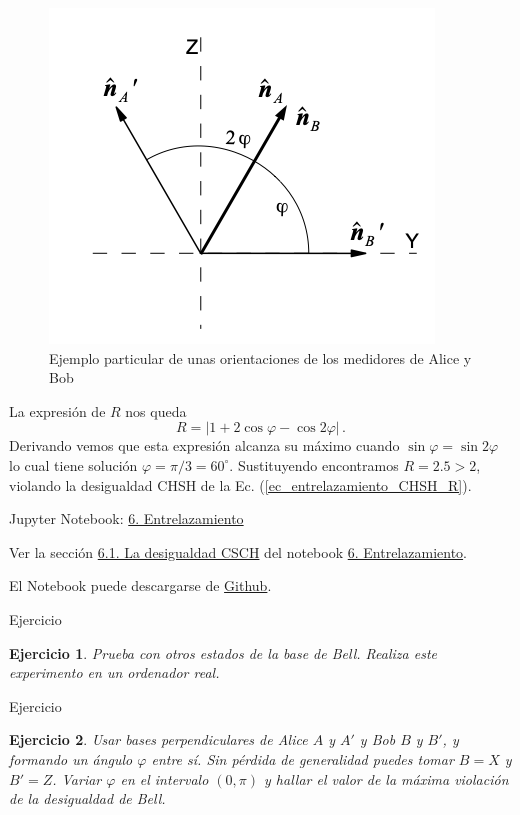 \documentclass[a4paper,11pt]{book} %
\newtheorem{ejercicio_contador}{Ejercicio}
\newcommand{\Ejercicio}[1]{
		\begin{mybox_gray}{Ejercicio} 
			\begin{ejercicio_contador}
				 #1 
			\end{ejercicio_contador} 
		\end{mybox_gray}
	}
\numberwithin{equation}{chapter}
\begin{document}
	\begin{figure}[t]
	\centering 
	\includegraphics[width=0.35\linewidth]{Figuras/Fig_entrelazamiento_CHSH_basis.png}
	\caption{Ejemplo particular de unas orientaciones de los medidores de Alice y Bob}
	\label{Fig_entrelazamiento_CHSH_basis}
	\end{figure}

La expresión de $R$ nos queda
\begin{equation}
R = |1 +  2 \cos\varphi  - \cos 2\varphi|\, .
\end{equation}
Derivando vemos que esta expresión alcanza su máximo cuando $\sin\varphi = \sin 2\varphi$ lo cual tiene solución $\varphi = \pi/3 = 60^\circ$. Sustituyendo encontramos $R= 2.5>2$, violando la desigualdad CHSH de la Ec. (\ref{ec_entrelazamiento_CHSH_R}).



	\begin{mybox_orange}{Jupyter Notebook: \href{https://www.scbi.uma.es/web/wp-content/uploads/Jupyterbook/CICC_UMA/Notebooks/html/docs/Part_01/Chapter_06-Entrelazamiento_myst.html}{6. Entrelazamiento}}
	
	Ver la sección \href{https://www.scbi.uma.es/web/wp-content/uploads/Jupyterbook/CICC_UMA/Notebooks/html/docs/Part_01/Chapter_06-Entrelazamiento_myst.html#sec-notebooks-entrelazamiento-1}{6.1. La desigualdad CSCH} del notebook \href{https://www.scbi.uma.es/web/wp-content/uploads/Jupyterbook/CICC_UMA/Notebooks/html/docs/Part_01/Chapter_06-Entrelazamiento_myst.html}{6. Entrelazamiento}.
	
	El Notebook puede descargarse de \href{https://github.com/davidcb98/CICC_UMA/blob/master/Notebooks/Part_01/Chapter_06-Entrelazamiento.ipynb}{Github}.
	\end{mybox_orange}
	
	\Ejercicio{
	Prueba con otros estados de la base de Bell. Realiza este experimento en un ordenador real.
	}
	
	\Ejercicio{
	Usar bases perpendiculares de  Alice $A$ y $A'$  y Bob $B$ y $B'$, y formando un ángulo $\varphi$ entre sí. Sin pérdida de generalidad puedes tomar $B = X$ y $B' = Z$. Variar $\varphi$ en el intervalo $(0,\pi)$ y hallar el valor de la máxima violación de la desigualdad de Bell.
	}
\end{document}

